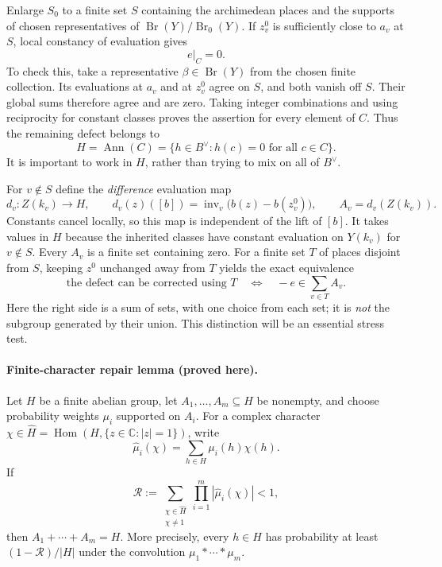 \documentclass[11pt]{article}
\newcommand{\C}{\mathbb{C}}
\begin{document}
Enlarge $S_0$ to a finite set $S$ containing the archimedean places and the
supports of chosen representatives of
$\operatorname{Br}(Y)/\operatorname{Br}_0(Y)$.  If $z_v^0$ is sufficiently close
to $a_v$ at $S$, local constancy of evaluation gives
\[
 e|_C=0.
\]
To check this, take a representative $\beta\in\operatorname{Br}(Y)$ from the
chosen finite collection.  Its evaluations at $a_v$ and at $z_v^0$ agree on
$S$, and both vanish off $S$.  Their global sums therefore agree and are zero.
Taking integer combinations and using reciprocity for constant classes proves
the assertion for every element of $C$.  Thus the remaining defect belongs to
\[
 H=\operatorname{Ann}(C)=\{h\in B^\vee:h(c)=0\text{ for all }c\in C\}.
\]
It is important to work in $H$, rather than trying to mix on all of $B^\vee$.

For $v\notin S$ define the \emph{difference} evaluation map
\begin{equation}\label{statement:local-difference}
 d_v:Z(k_v)\longrightarrow H,\qquad
 d_v(z)([b])=\operatorname{inv}_v\bigl(b(z)-b(z_v^0)\bigr),
 \qquad A_v=d_v(Z(k_v)).
\end{equation}
Constants cancel locally, so this map is independent of the lift of $[b]$.
It takes values in $H$ because the inherited classes have constant evaluation
on $Y(k_v)$ for $v\notin S$.  Every $A_v$ is a finite set containing zero.
For a finite set $T$ of places disjoint from $S$, keeping $z^0$ unchanged away
from $T$ yields the exact equivalence
\begin{equation}\label{statement:sumset}
 \text{the defect can be corrected using $T$}
 \quad\Longleftrightarrow\quad
 -e\in\sum_{v\in T}A_v.
\end{equation}
Here the right side is a sum of sets, with one choice from each set; it is
\emph{not} the subgroup generated by their union.  This distinction will be
an essential stress test.

\paragraph{Finite-character repair lemma (proved here).}
Let $H$ be a finite abelian group, let $A_1,\ldots,A_m\subseteq H$ be nonempty,
and choose probability weights $\mu_i$ supported on $A_i$.  For a complex
character $\chi\in\widehat H=\operatorname{Hom}(H,\{z\in\C:|z|=1\})$, write
\[
 \widehat\mu_i(\chi)=\sum_{h\in H}\mu_i(h)\chi(h).
\]
If
\begin{equation}\label{statement:fourier-condition}
 \mathcal R:=\sum_{\substack{\chi\in\widehat H\\\chi\ne1}}
                  \prod_{i=1}^m|\widehat\mu_i(\chi)|<1,
\end{equation}
then $A_1+\cdots+A_m=H$.  More precisely, every $h\in H$ has probability at
least $(1-\mathcal R)/|H|$ under the convolution $\mu_1*\cdots*\mu_m$.
\end{document}
